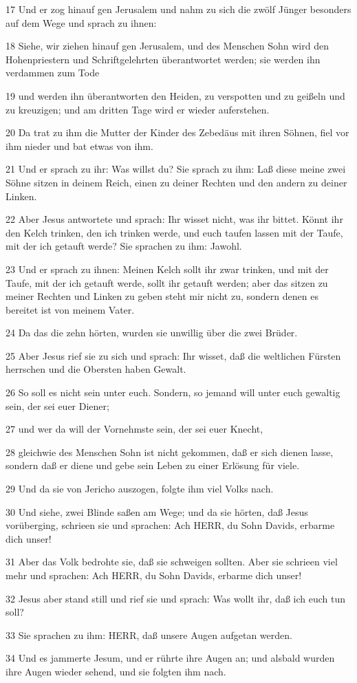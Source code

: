 \par 17 Und er zog hinauf gen Jerusalem und nahm zu sich die zwölf Jünger besonders auf dem Wege und sprach zu ihnen:
\par 18 Siehe, wir ziehen hinauf gen Jerusalem, und des Menschen Sohn wird den Hohenpriestern und Schriftgelehrten überantwortet werden; sie werden ihn verdammen zum Tode
\par 19 und werden ihn überantworten den Heiden, zu verspotten und zu geißeln und zu kreuzigen; und am dritten Tage wird er wieder auferstehen.
\par 20 Da trat zu ihm die Mutter der Kinder des Zebedäus mit ihren Söhnen, fiel vor ihm nieder und bat etwas von ihm.
\par 21 Und er sprach zu ihr: Was willst du? Sie sprach zu ihm: Laß diese meine zwei Söhne sitzen in deinem Reich, einen zu deiner Rechten und den andern zu deiner Linken.
\par 22 Aber Jesus antwortete und sprach: Ihr wisset nicht, was ihr bittet. Könnt ihr den Kelch trinken, den ich trinken werde, und euch taufen lassen mit der Taufe, mit der ich getauft werde? Sie sprachen zu ihm: Jawohl.
\par 23 Und er sprach zu ihnen: Meinen Kelch sollt ihr zwar trinken, und mit der Taufe, mit der ich getauft werde, sollt ihr getauft werden; aber das sitzen zu meiner Rechten und Linken zu geben steht mir nicht zu, sondern denen es bereitet ist von meinem Vater.
\par 24 Da das die zehn hörten, wurden sie unwillig über die zwei Brüder.
\par 25 Aber Jesus rief sie zu sich und sprach: Ihr wisset, daß die weltlichen Fürsten herrschen und die Obersten haben Gewalt.
\par 26 So soll es nicht sein unter euch. Sondern, so jemand will unter euch gewaltig sein, der sei euer Diener;
\par 27 und wer da will der Vornehmste sein, der sei euer Knecht,
\par 28 gleichwie des Menschen Sohn ist nicht gekommen, daß er sich dienen lasse, sondern daß er diene und gebe sein Leben zu einer Erlösung für viele.
\par 29 Und da sie von Jericho auszogen, folgte ihm viel Volks nach.
\par 30 Und siehe, zwei Blinde saßen am Wege; und da sie hörten, daß Jesus vorüberging, schrieen sie und sprachen: Ach HERR, du Sohn Davids, erbarme dich unser!
\par 31 Aber das Volk bedrohte sie, daß sie schweigen sollten. Aber sie schrieen viel mehr und sprachen: Ach HERR, du Sohn Davids, erbarme dich unser!
\par 32 Jesus aber stand still und rief sie und sprach: Was wollt ihr, daß ich euch tun soll?
\par 33 Sie sprachen zu ihm: HERR, daß unsere Augen aufgetan werden.
\par 34 Und es jammerte Jesum, und er rührte ihre Augen an; und alsbald wurden ihre Augen wieder sehend, und sie folgten ihm nach.


